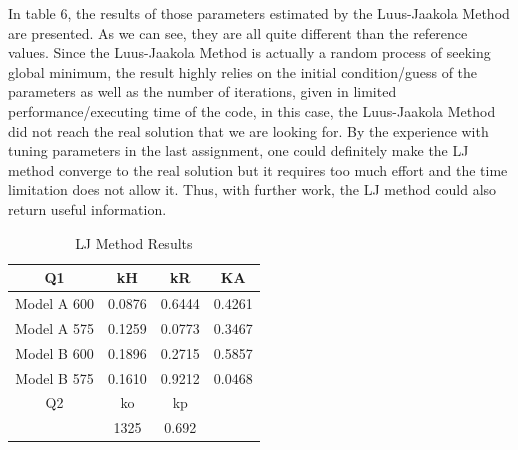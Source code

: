 \documentclass[a4paper,12pt]{article} %
\begin{document}
\clearpage

In table 6, the results of those parameters estimated by the Luus-Jaakola Method are presented. As we can see, they are all 
quite different than the reference values. Since the Luus-Jaakola Method is actually a random process of seeking global 
minimum, the result highly relies on the initial condition/guess of the parameters as well as the number of iterations, 
given in limited performance/executing time of the code, in this case, the Luus-Jaakola Method did not reach the real 
solution that we are looking for. By the experience with tuning parameters in the last assignment, one could definitely
make the LJ method converge to the real solution but it requires too much effort and the time limitation does not allow it. 
Thus, with further work, the LJ method could also return useful information.
\begin{table}[ht]
    \caption{LJ Method Results}
    \centering
    \begin{tabular}{|c|c|c|c|}
        \hline
        Q1 & kH & kR & KA \\
        \hline   
        Model A 600& 0.0876& 0.6444& 0.4261 \\
        Model A 575& 0.1259& 0.0773& 0.3467 \\
        Model B 600& 0.1896& 0.2715& 0.5857 \\
        Model B 575& 0.1610& 0.9212& 0.0468 \\
        \hline
        Q2 & ko & kp&\\
        \hline
         & 1325 & 0.692 &  \\
        \hline
    \end{tabular}
\end{table}
\end{document}
